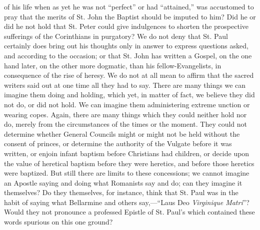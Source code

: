 of his life when as yet he was not ``perfect'' or had ``attained,'' was
accustomed to pray that the merits of St. John the Baptist should be
imputed to him? Did he or did he not hold that St. Peter could give
indulgences to shorten the prospective sufferings of the Corinthians
in purgatory? We do not deny that St. Paul certainly does bring out
his thoughts only in answer to express questions asked, and according
to the occasion; or that St. John has written a Gospel, on the one
hand later, on the other more dogmatic, than his
fellow-Evangelists, in consequence of the rise of heresy. We do not at
all mean to affirm that the sacred writers said out at one time all
they had to say. There are many things we can imagine them doing and
holding, which yet, in matter of fact, we believe they did not do, or
did not hold. We can imagine them administering extreme unction or
wearing copes. Again, there are many things which they could neither
hold nor do, merely from the circumstances of the times or the moment.
They could not determine whether General Councils might or might not
be held without the consent of princes, or determine the authority of
the Vulgate before it was written, or enjoin infant baptism before
Christians had children, or decide upon the value of heretical baptism
before they were heretics, and before those heretics were baptized.
But still there are limits to these concessions; we cannot imagine an
Apostle saying and doing what Romanists say and do; can they imagine
it themselves? Do they themselves, for instance, think that St. Paul
was in the habit of saying what Bellarmine and others say,—``Laus Deo
\emph{Virginique Matri}''? Would they not pronounce a professed Epistle
of St. Paul's which contained these words spurious on this one ground?

